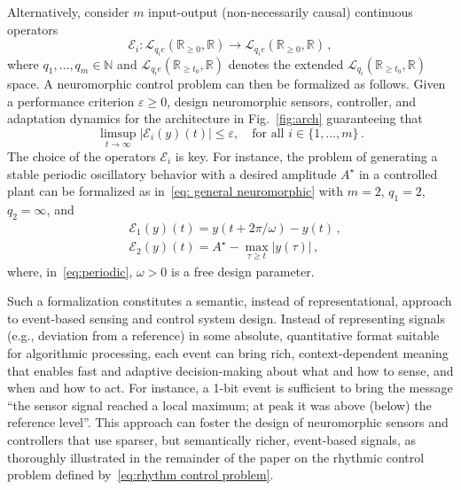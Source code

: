 \documentclass{article}
\newcommand{\RR}{\mathbb{R}}
\theoremstyle{definition}
\theoremstyle{remark}
\begin{document}
Alternatively, consider $m$ input-output (non-necessarily causal) continuous operators
\begin{equation*}
    \mathcal{E}_{i}: \mathcal{L}_{q_ie}(\RR_{\geq 0},\RR) \to \mathcal{L}_{q_ie}(\RR_{\geq 0},\RR)\,,
\end{equation*}
where $q_1,\ldots,q_m\in\mathbb N$ and $\mathcal{L}_{q_ie}(\RR_{\geq t_0},\RR)$ denotes the extended $\mathcal{L}_{q_i}(\RR_{\geq t_0},\RR)$ space. A neuromorphic control problem can then be formalized as follows. Given a performance criterion $\varepsilon\geq 0$, design neuromorphic sensors, controller, and adaptation dynamics for the architecture in Fig.~\ref{fig:arch} guaranteeing that 
    \begin{equation}\label{eq: general neuromorphic}
        \limsup_{t\to\infty} \big|\mathcal{E}_{i}(y)(t)\big|\leq \varepsilon,\quad\text{for all $i\in\{1,\ldots,m\}$} \,.
    \end{equation}
The choice of the operators $\mathcal{E}_{i}$ is key. For instance, the problem of generating a stable periodic oscillatory behavior with a desired amplitude $A^\star$ in a controlled plant can be formalized as in~\eqref{eq: general neuromorphic} with $m=2$, $q_1 = 2$, $q_2 = \infty$, and
\begin{subequations}\label{eq:rhythm control problem}
    \begin{align}
    &\mathcal{E}_{1}(y)(t)=y(t+2\pi/\omega) - y(t) \,, \label{eq:periodic} \\ %
    &\mathcal{E}_{2}(y)(t)= A^\star - \max_{\tau\geq t}|y(\tau)| \,,
\end{align}
\end{subequations}
where, in~\eqref{eq:periodic}, $\omega>0$ is a free design parameter. 

Such a formalization constitutes a semantic, instead of representational, approach to event-based sensing and control system design. Instead of representing signals (e.g., deviation from a reference) in some absolute, quantitative format suitable for algorithmic processing, each event can bring rich, context-dependent meaning that enables fast and adaptive decision-making about what and how to sense, and when and how to act. For instance, a 1-bit event is sufficient to bring the message ``the sensor signal reached a local maximum; at peak it was above (below) the reference level''. This approach can foster the design of neuromorphic sensors and controllers that use sparser, but semantically richer, event-based signals, as thoroughly illustrated in the remainder of the paper on the rhythmic control problem defined by~\eqref{eq:rhythm control problem}.
\end{document}
